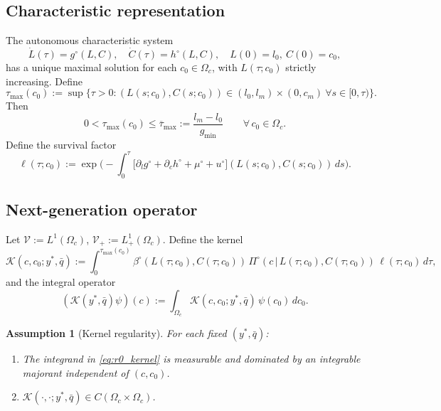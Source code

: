 \documentclass[pdflatex,sn-mathphys-num]{sn-jnl}%
\newtheorem{assumption}[theorem]{Assumption}
\begin{document}
\subsection{Characteristic representation}
The autonomous characteristic system
\begin{equation}\label{eq:r0_chars}
\dot L(\tau)=g^\circ(L,C),\quad
\dot C(\tau)=h^\circ(L,C),\quad
L(0)=l_0,\ C(0)=c_0,
\end{equation}
has a unique maximal solution for each \(c_0\in\Omega_c\),
with \(L(\tau;c_0)\) strictly increasing. Define
\[
\tau_{\max}(c_0)
:=\sup\{\tau>0:(L(s;c_0),C(s;c_0))\in(l_0,l_m)\times(0,c_m)\ \forall s\in[0,\tau)\}.
\]
Then
\begin{equation}\label{eq:r0_tau_bound}
0<\tau_{\max}(c_0)\le \overline\tau_{\max}:=\frac{l_m-l_0}{g_{\min}}
\qquad\forall\,c_0\in\Omega_c.
\end{equation}
Define the survival factor
\begin{equation}\label{eq:r0_survival}
\ell(\tau;c_0)
:=
\exp\!\Big(
-\int_0^\tau
\big[
\partial_l g^\circ+\partial_c h^\circ+\mu^\circ+u^\circ
\big](L(s;c_0),C(s;c_0))\,ds
\Big).
\end{equation}

\subsection{Next-generation operator}
Let \(\mathcal V:=L^1(\Omega_c)\), \(\mathcal V_+:=L^1_+(\Omega_c)\).
Define the kernel
\begin{equation}\label{eq:r0_kernel}
\mathscr K(c,c_0;y^\ast,\bar q)
:=
\int_0^{\tau_{\max}(c_0)}
\beta^\circ(L(\tau;c_0),C(\tau;c_0))\,
\Pi^\circ(c\,|\,L(\tau;c_0),C(\tau;c_0))\,
\ell(\tau;c_0)\,d\tau,
\end{equation}
and the integral operator
\begin{equation}\label{eq:r0_operator}
(\mathcal K(y^\ast,\bar q)\psi)(c)
:=
\int_{\Omega_c}\mathscr K(c,c_0;y^\ast,\bar q)\,\psi(c_0)\,dc_0.
\end{equation}

\begin{assumption}[Kernel regularity]\label{ass:r0_kernel}
For each fixed \((y^\ast,\bar q)\):
\begin{enumerate}[label=\textup{(K\arabic*)}]
\item The integrand in \eqref{eq:r0_kernel} is measurable and dominated by an integrable
majorant independent of \((c,c_0)\).
\item \(\mathscr K(\cdot,\cdot;y^\ast,\bar q)\in C(\Omega_c\times\Omega_c)\).
\end{enumerate}
\end{assumption}
\end{document}
